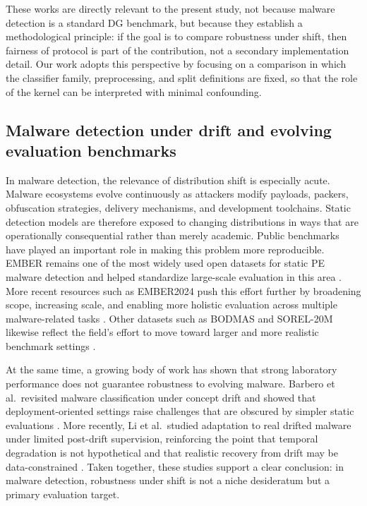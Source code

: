 \documentclass[pdflatex,sn-mathphys-num]{sn-jnl}%
\theoremstyle{thmstyleone}%
\theoremstyle{thmstyletwo}%
\theoremstyle{thmstylethree}%
\begin{document}
These works are directly relevant to the present study, not because malware detection is a standard DG benchmark, but because they establish a methodological principle: if the goal is to compare robustness under shift, then fairness of protocol is part of the contribution, not a secondary implementation detail. Our work adopts this perspective by focusing on a comparison in which the classifier family, preprocessing, and split definitions are fixed, so that the role of the kernel can be interpreted with minimal confounding.

\subsection{Malware detection under drift and evolving evaluation benchmarks}

In malware detection, the relevance of distribution shift is especially acute. Malware ecosystems evolve continuously as attackers modify payloads, packers, obfuscation strategies, delivery mechanisms, and development toolchains. Static detection models are therefore exposed to changing distributions in ways that are operationally consequential rather than merely academic. Public benchmarks have played an important role in making this problem more reproducible. EMBER remains one of the most widely used open datasets for static PE malware detection and helped standardize large-scale evaluation in this area \cite{anderson2018ember}. More recent resources such as EMBER2024 push this effort further by broadening scope, increasing scale, and enabling more holistic evaluation across multiple malware-related tasks \cite{joyce2025ember2024}. Other datasets such as BODMAS and SOREL-20M likewise reflect the field's effort to move toward larger and more realistic benchmark settings \cite{yang2021bodmas,harang2020sorel20m}.

At the same time, a growing body of work has shown that strong laboratory performance does not guarantee robustness to evolving malware. Barbero et al.\ revisited malware classification under concept drift and showed that deployment-oriented settings raise challenges that are obscured by simpler static evaluations \cite{barbero2022transcending}. More recently, Li et al.\ studied adaptation to real drifted malware under limited post-drift supervision, reinforcing the point that temporal degradation is not hypothetical and that realistic recovery from drift may be data-constrained \cite{li2025revisitingdrift}. Taken together, these studies support a clear conclusion: in malware detection, robustness under shift is not a niche desideratum but a primary evaluation target.
\end{document}
